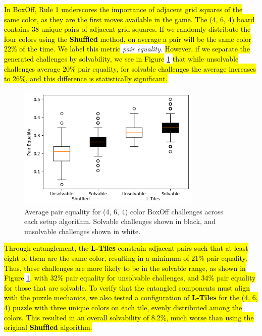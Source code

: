 \documentclass[journal]{IEEEtran}
\begin{document}

\hl{In BoxOff, Rule 1 underscores the importance of adjacent grid squares of the same color, as they are the first moves available in the game. The (4, 6, 4) board contains 38 unique pairs of adjacent grid squares. If we randomly distribute the four colors using the \textbf{Shuffled} method, on average a pair will be the same color 22\% of the time. We label this metric} {\it pair equality}. \hl{However, if we separate the generated challenges by solvability, we see in Figure} \ref{fig:boxoffconnected} \hl{that while unsolvable challenges average 20\% pair equality, for solvable challenges the average increases to 26\%, and this difference is statistically significant.}

\begin{figure}[t]
\includegraphics[width=8.8cm]{figure18.png}
\caption{Average pair equality for (4, 6, 4) color BoxOff challenges across each setup algorithm. Solvable challenges shown in black, and unsolvable challenges shown in white.}
\label{fig:boxoffconnected}
\end{figure}

\hl{Through entanglement, the \textbf{L-Tiles} constrain adjacent pairs such that at least eight of them are the same color, resulting in a minimum of 21\% pair equality. Thus, these challenges are more likely to be in the solvable range, as shown in Figure} \ref{fig:boxoffconnected}\hl{, with 32\% pair equality for unsolvable challenges, and 34\% pair equality for those that are solvable. To verify that the entangled components must align with the puzzle mechanics, we also tested a configuration of \textbf{L-Tiles} for the (4, 6, 4) puzzle with three unique colors on each tile, evenly distributed among the colors. This resulted in an overall solvability of 8.2\%, much worse than using the original \textbf{Shuffled} algorithm.}
\end{document}
